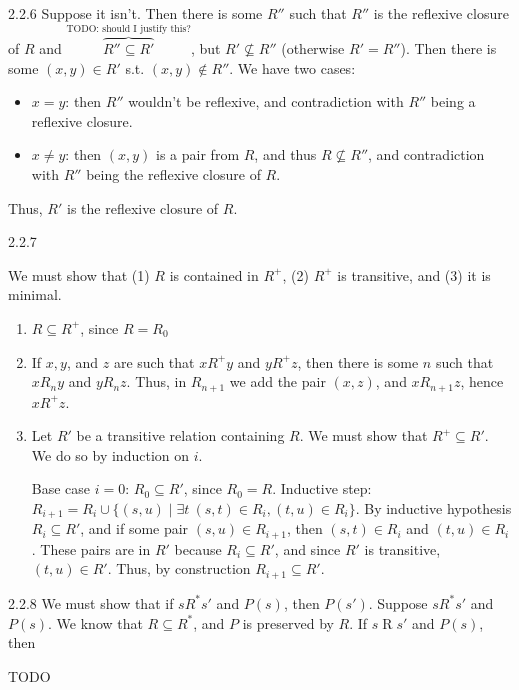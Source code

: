 2.2.6 Suppose it isn't. Then there is some \(R''\) such that \(R''\) is the
reflexive closure of \(R\) and \(\overbrace{R'' \subseteq R'}^{\text{TODO: should I justify this?}}\), but \(R' \not\subseteq
R''\) (otherwise \(R' = R''\)). Then there is some \((x,y) \in R'\) s.t.
\((x, y) \notin R''\). We have two cases:
\begin{itemize}
  \item \(x = y\): then \(R''\) wouldn't be reflexive, and contradiction with
  \(R''\) being a reflexive closure.
  \item \(x \neq y\): then \((x, y)\) is a pair from \(R\), and thus \(R \not
  \subseteq R''\), and contradiction with \(R''\) being the reflexive closure
  of \(R\).
\end{itemize}
Thus, \(R'\) is the reflexive closure of \(R\).

2.2.7

We must show that (1) \(R\) is contained in \(R^+\), (2) \(R^+\) is
transitive, and (3) it is minimal.
{%
\newcommand{\Rt}{\mathbin{R^+}}
\newcommand{\Rn}{\mathbin{R_n}}
\begin{enumerate}
  \item \(R \subseteq R^+\), since \(R = R_0\)
  \item If \(x, y\), and \(z\) are such that \(x\Rt y\) and \(y\Rt z\),
  then there is some \(n\) such that \(x\Rn y\) and \(y\Rn z\). Thus, in
  \(R_{n+1}\) we add the pair \((x, z)\), and \(x\mathbin{R_{n+1}}z\), hence
  \(x\Rt z\).
  \item Let \(R'\) be a transitive relation containing \(R\). We must show
  that \(R^+ \subseteq R'\). We do so by induction on \(i\).

  Base case \(i = 0\): \(R_0 \subseteq R'\), since \(R_0 = R\).
  Inductive step: \(R_{i+1} = R_i \cup \{(s, u) \mid \exists t~(s,t) \in R_i,
  (t,u) \in R_i\}\). By inductive hypothesis \(R_i \subseteq R'\), and if
  some pair \((s, u) \in R_{i+1}\), then \((s,t) \in R_i\) and \((t, u) \in
  R_i\). These pairs are in \(R'\) because \(R_i \subseteq R'\), and since
  \(R'\) is transitive, \((t, u) \in R'\). Thus, by construction \(R_{i+1}
  \subseteq R'\).
\end{enumerate}
}

{%
\renewcommand{\R}{\mathbin{R}}
\newcommand{\Rs}{\mathbin{R^*}}
2.2.8 We must show that if \(s\Rs s'\) and \(P(s)\), then \(P(s')\). Suppose \(s\Rs s'\) and \(P(s)\). We know that \(R \subseteq R^*\), and \(P\) is preserved by \(R\).
If \(s\R s'\) and \(P(s)\), then

TODO
}

